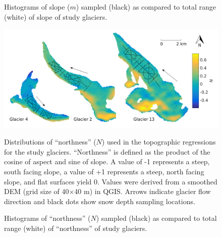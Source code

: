 \documentclass{sfuthesis}
\newcommand{\topomap}{Arrows indicate glacier flow direction and black dots show snow depth sampling locations. }
\begin{document}
\begin{figure}[H]
	\caption{Histograms of slope ($m$) sampled (black) as compared to total range (white) of slope of study glaciers.}
	\label{sampledRange:slope}
\end{figure}

\begin{figure}[H]
	\centering
	\includegraphics[width=\textwidth]{Map_northness.png}\\
	\caption{Distributions of ``northness'' ($N$) used in the topographic regressions for the study glaciers. ``Northness'' is defined as the product of the cosine of aspect and sine of slope. A value of -1 represents a steep, south facing slope, a value of +1 represents a steep, north facing slope, and flat surfaces yield 0. Values were derived from a smoothed DEM (grid size of 40$\times$40 m) in QGIS. \topomap}
	\label{map:northness}
\end{figure}

\begin{figure}[H]
	\caption{Histograms of ``northness'' ($N$) sampled (black) as compared to total range (white) of ``northness'' of study glaciers.}
	\label{sampledRange:northness}
\end{figure}
\end{document}
